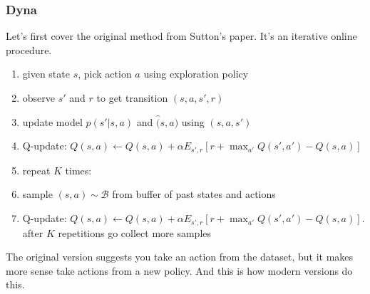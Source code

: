 \documentclass{report}
\begin{document}
\subsubsection{Dyna}
Let's first cover the original method from Sutton's paper.
It's an iterative online procedure.
\begin{enumerate}
		\item given state $s$, pick action $a$ using exploration policy
		\item observe $s'$ and $r$ to get transition $(s,a,s',r) $
		\item update model $\hat{p}(s'|s,a)$ and $\hat(s,a)$ using $(s,a,s')$
		\item Q-update: $Q(s,a) \leftarrow Q(s,a) + \alpha E_{s',r} \left[ r+ \max_{a'} Q(s',a') - Q(s,a) \right] $
		\item repeat $K$ times:
		\item sample $(s,a) \sim \mathcal{B}$ from buffer of past states and actions
		\item Q-update: $Q(s,a) \leftarrow Q(s,a) + \alpha E_{s',r} \left[ r+ \max_{a'} Q(s',a') - Q(s,a) \right] $. after $K $ repetitions go
				collect more samples
\end{enumerate}
The original version suggests you take an action from the dataset, but it makes more sense take actions from a new policy.
And this is how modern versions do this.
\end{document}

